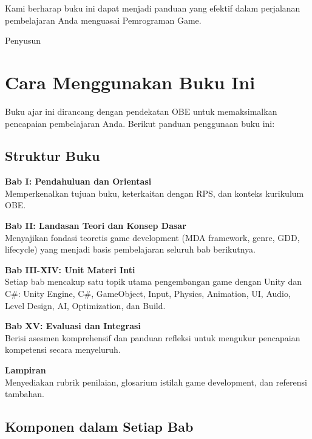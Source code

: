 Kami berharap buku ini dapat menjadi panduan yang efektif dalam perjalanan pembelajaran Anda menguasai Pemrograman Game.

\vspace{1cm}
\begin{flushright}
Penyusun
\end{flushright}

\cleardoublepage

\chapter*{Cara Menggunakan Buku Ini}

Buku ajar ini dirancang dengan pendekatan OBE untuk memaksimalkan pencapaian pembelajaran Anda. Berikut panduan penggunaan buku ini:

\section*{Struktur Buku}

\textbf{Bab I: Pendahuluan dan Orientasi}\\
Memperkenalkan tujuan buku, keterkaitan dengan RPS, dan konteks kurikulum OBE.

\textbf{Bab II: Landasan Teori dan Konsep Dasar}\\
Menyajikan fondasi teoretis game development (MDA framework, genre, GDD, lifecycle) yang menjadi basis pembelajaran seluruh bab berikutnya.

\textbf{Bab III-XIV: Unit Materi Inti}\\
Setiap bab mencakup satu topik utama pengembangan game dengan Unity dan C\#: Unity Engine, C\#, GameObject, Input, Physics, Animation, UI, Audio, Level Design, AI, Optimization, dan Build.

\textbf{Bab XV: Evaluasi dan Integrasi}\\
Berisi asesmen komprehensif dan panduan refleksi untuk mengukur pencapaian kompetensi secara menyeluruh.

\textbf{Lampiran}\\
Menyediakan rubrik penilaian, glosarium istilah game development, dan referensi tambahan.

\section*{Komponen dalam Setiap Bab}


